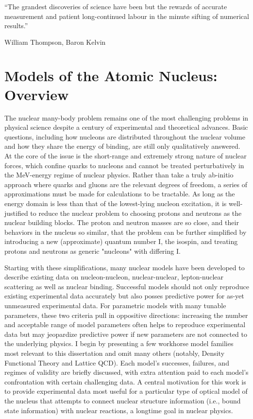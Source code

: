 \epigraph{``The grandest discoveries of science have been but the rewards of
    accurate measurement and patient long-continued labour in the minute
sifting of numerical results.''}{William Thompson,  Baron Kelvin}

\section{Models of the Atomic Nucleus: Overview}
The nuclear many-body problem remains one of the most challenging problems in
physical science despite a century of experimental and theoretical advances.
Basic questions, including how nucleons are distributed throughout the nuclear
volume and how they share the energy of binding, are still only qualitatively
answered. At the core of the issue is the short-range and extremely strong
nature of nuclear forces, which confine
quarks to nucleons and cannot be treated perturbatively in the MeV-energy regime of
nuclear physics. Rather than take a truly ab-initio approach where quarks and gluons
are the relevant degrees of freedom, a series of approximations must be made
for calculations to be tractable. As long as the energy domain is less than that
of the lowest-lying nucleon excitation, it is well-justified to reduce the
nuclear problem to choosing protons and neutrons as the nuclear building blocks.
The proton and neutron masses are so close, and their behaviors in the nucleus so similar,
that the problem can be further simplified by introducing a new (approximate) quantum number
I, the isospin, and treating protons and neutrons as generic "nucleons" with differing I.

Starting with these simplifications, many nuclear models have been developed to describe existing 
data on nucleon-nucleon, nuclear-nuclear, lepton-nuclear scattering as well as
nuclear binding. Successful models should not only reproduce existing
experimental data accurately but also posses predictive power for as-yet unmeasured
experimental data. For parametric models
with many tunable parameters, these two criteria pull in oppositive directions:
increasing the number
and acceptable range of model parameters often helps to reproduce experimental data but may
jeopardize predictive power if new parameters are not connected to the underlying physics.
I begin by presenting a few workhorse model families most relevant
to this dissertation and omit many others (notably, Density Functional Theory
and Lattice QCD). Each model's successes,
failures, and regimes of validity are briefly discussed, with extra attention paid
to each model's confrontation with certain challenging data.
A central motivation for this work is to provide experimental data most useful
for a particular type of optical model of the nucleus that attempts to
connect nuclear structure information (i.e., bound state information) with nuclear
reactions, a longtime goal in nuclear physics. 

